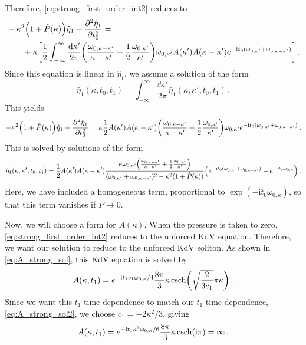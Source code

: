 \documentclass{jfm}
\newcommand{\GenPk}{\hat{P}(\kappa)}
\newcommand{\im}{\mathrm{i}}
\begin{document}
Therefore, \cref{eq:strong_first_order_int2} reduces to
\begin{equation}
  \begin{split}
  &-\kappa^2 \pqty{1 + \GenPk} \hat{\eta}_1 - \pdv[2]{\hat{\eta}_1}{t_0}
    = \\
    &\qquad
    + \kappa \bqty{\frac{1}{2} \int_{-\infty}^{\infty}
      \frac{\dd{\kappa'}}{2 \pi}
    \pqty{
      \frac{\omega_{0,\kappa-\kappa'}}{\kappa-\kappa'}
      + \frac{1}{2} \frac{\omega_{0,\kappa'}}{\kappa'}
    } \omega_{0,\kappa'} A(\kappa') A(\kappa-\kappa')
    e^{-\im t_0 (\omega_{0,\kappa'} + \omega_{0,\kappa-\kappa'})}} \,.
  \end{split}
\end{equation}
Since this equation is linear in $\hat{\eta}_1$, we assume a solution of
the form
\begin{equation}
  \hat{\eta}_1(\kappa,t_0,t_1) = \int_{-\infty}^{\infty}
  \frac{\dd{\kappa'}}{2 \pi} \hat{\eta}_1(\kappa,\kappa',t_0,t_1) \,.
\end{equation}
This yields
\begin{equation}
  -\kappa^2 \pqty{1 + \GenPk} \hat{\eta}_1 - \pdv[2]{\hat{\eta}_1}{t_0}
    =
    \kappa \frac{1}{2} A(\kappa') A(\kappa-\kappa')
    \pqty{
      \frac{\omega_{0,\kappa-\kappa'}}{\kappa-\kappa'}
      + \frac{1}{2} \frac{\omega_{0,\kappa'}}{\kappa'}
    } \omega_{0,\kappa'}
    e^{-\im t_0 (\omega_{0,\kappa'} + \omega_{0,\kappa-\kappa'})} \,.
\end{equation}
This is solved by solutions of the form
\begin{equation}
  \hat{\eta}_1(\kappa,\kappa',t_0,t_1) =
  \frac{1}{2} A(\kappa') A(\kappa-\kappa')
  \frac{\kappa \omega_{0,\kappa'} \pqty{
  \frac{\omega_{0,\kappa-\kappa'}}{\kappa-\kappa'}
  +\frac{1}{2} \frac{\omega_{0,\kappa'}}{\kappa'}
  } }
  { (\omega_{0,\kappa'} + \omega_{0,\kappa-\kappa'})^2 - \kappa^2 (1 +
  \GenPk)}
  \pqty{e^{-\im t_0 (\omega_{0,\kappa'} + \omega_{0,\kappa-\kappa'})}
  - e^{-\im t_0 \omega_{0,\kappa}}
  } \,.
\end{equation}
Here, we have included a homogeneous term, proportional to
$\exp(-\im t_0 \omega_{0,\kappa})$, so that this term vanishes if $P \to
0$.

Now, we will choose a form for $A(\kappa)$.
When the pressure is taken to zero, \cref{eq:strong_first_order_int2}
reduces to the unforced KdV equation.
Therefore, we want our solution to reduce to the unforced KdV soliton.
As shown in \cref{eq:A_strong_sol}, this KdV equation is solved by
\begin{equation}
  A(\kappa, t_1) = e^{-\im t_1 c_1 \omega_{0,\kappa}/4}
  \frac{8 \pi}{3} \kappa \csch( \sqrt{\frac{2}{3 c_1}} \pi \kappa)
  \,.
\end{equation}
Since we want this $t_1$ time-dependence to match our $t_1$
time-dependence, \cref{eq:A_strong_sol2}, we choose $c_1 = -2
\kappa^2/3$, giving
\begin{equation}
  A(\kappa, t_1) = e^{-\im t_1 \kappa^2 \omega_{0,\kappa}/6}
  \frac{8 \pi}{3} \kappa \csch( \im \pi ) = \infty
  \,.
\end{equation}
\end{document}
